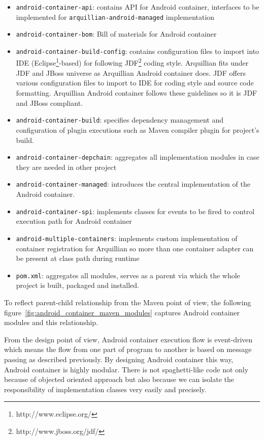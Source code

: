 \documentclass[12pt,final,oneside]{fithesis}
\begin{document}
\begin{itemize}
	\item{\texttt{android-container-api}: contains API for Android container, interfaces to be implemented for \texttt{arquillian-android-managed} implementation}
	\item{\texttt{android-container-bom}: Bill of materials for Android container}
	\item{\texttt{android-container-build-config}: contains configuration files to import into IDE (Eclipse\footnote{http://www.eclipse.org/}-based) for following JDF\footnote{http://www.jboss.org/jdf/} coding style. Arquillian fits under JDF and JBoss universe as Arquillian Android container does. JDF offers various configuration files to import to IDE for coding style and source code formatting. Arquillian Android container follows these guidelines so it is JDF and JBoss compliant.}
	\item{\texttt{android-container-build}: specifies dependency management and configuration of plugin executions such as Maven compiler plugin for project's build.}
	\item{\texttt{android-container-depchain}: aggregates all implementation modules in case they are needed in other project}
	\item{\texttt{android-container-managed}: introduces the central implementation of the Android container.}
	\item{\texttt{android-container-spi}: implements classes for events to be fired to control execution path for Android container}
	\item{\texttt{android-multiple-containers}: implements custom implementation of container registration for Arquillian so more than one container adapter can be present at class path during runtime}
	\item{\texttt{pom.xml}: aggregates all modules, serves as a parent via which the whole project is built, packaged and installed.}
\end{itemize}

To reflect parent-child relationship from the Maven point of view, the following figure~\ref{fig:android_container_maven_modules} captures Android container modules and this relationship.

From the design point of view, Android container execution flow is event-driven which means the flow from one part of program to another is based on message passing as described previously. By designing Android container this way, Android container is highly modular. There is not spaghetti-like code not only because of objected oriented approach but also because we can isolate the responsibility of implementation classes very easily and precisely.
\end{document}
